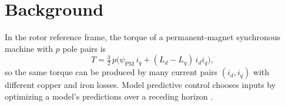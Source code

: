\chapter{Background}
\label{ch:background}

In the rotor reference frame, the torque of a permanent-magnet synchronous machine with $p$ pole
pairs is
\begin{equation}
  T = \tfrac{3}{2}\, p \bigl(\psi_{\mathrm{PM}}\, i_q + (L_d - L_q)\, i_d i_q\bigr),
  \label{eq:torque}
\end{equation}
so the same torque can be produced by many current pairs $(i_d, i_q)$ with different copper and
iron losses. Model predictive control chooses inputs by optimizing a model's predictions over
a receding horizon \citep{rawlings2017}.
